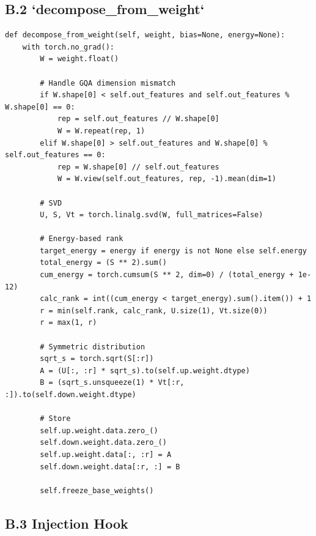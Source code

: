 \subsection{B.2 `decompose\_from\_weight`}

\begin{lstlisting}
def decompose_from_weight(self, weight, bias=None, energy=None):
    with torch.no_grad():
        W = weight.float()
        
        # Handle GQA dimension mismatch
        if W.shape[0] < self.out_features and self.out_features % W.shape[0] == 0:
            rep = self.out_features // W.shape[0]
            W = W.repeat(rep, 1)
        elif W.shape[0] > self.out_features and W.shape[0] % self.out_features == 0:
            rep = W.shape[0] // self.out_features
            W = W.view(self.out_features, rep, -1).mean(dim=1)
        
        # SVD
        U, S, Vt = torch.linalg.svd(W, full_matrices=False)
        
        # Energy-based rank
        target_energy = energy if energy is not None else self.energy
        total_energy = (S ** 2).sum()
        cum_energy = torch.cumsum(S ** 2, dim=0) / (total_energy + 1e-12)
        calc_rank = int((cum_energy < target_energy).sum().item()) + 1
        r = min(self.rank, calc_rank, U.size(1), Vt.size(0))
        r = max(1, r)
        
        # Symmetric distribution
        sqrt_s = torch.sqrt(S[:r])
        A = (U[:, :r] * sqrt_s).to(self.up.weight.dtype)
        B = (sqrt_s.unsqueeze(1) * Vt[:r, :]).to(self.down.weight.dtype)
        
        # Store
        self.up.weight.data.zero_()
        self.down.weight.data.zero_()
        self.up.weight.data[:, :r] = A
        self.down.weight.data[:r, :] = B
        
        self.freeze_base_weights()
\end{lstlisting}

\subsection{B.3 Injection Hook}

